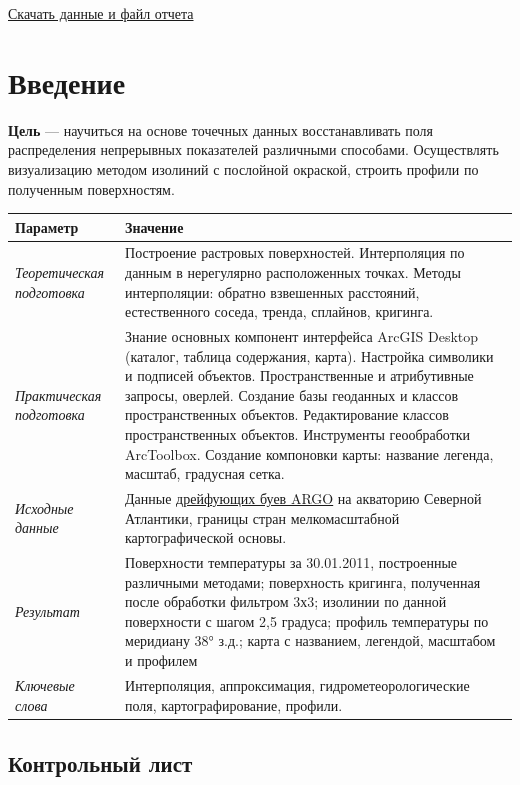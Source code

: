 \documentclass[12pt,]{book}
\begin{document}
\href{http://autolab.geogr.msu.ru/gis/data/Ex17.zip}{Скачать данные и файл отчета}

\hypertarget{interpolation-intro}{%
\section{Введение}\label{interpolation-intro}}

\textbf{Цель} --- научиться на основе точечных данных восстанавливать поля распределения непрерывных показателей различными способами. Осуществлять визуализацию методом изолиний с послойной окраской, строить профили по полученным поверхностям.

\begin{longtable}[]{@{}ll@{}}
\toprule
Параметр & Значение\tabularnewline
\midrule
\endhead
\emph{Теоретическая подготовка} & Построение растровых поверхностей. Интерполяция по данным в нерегулярно расположенных точках. Методы интерполяции: обратно взвешенных расстояний, естественного соседа, тренда, сплайнов, кригинга.\tabularnewline
\emph{Практическая подготовка} & Знание основных компонент интерфейса ArcGIS Desktop (каталог, таблица содержания, карта). Настройка символики и подписей объектов. Пространственные и атрибутивные запросы, оверлей. Создание базы геоданных и классов пространственных объектов. Редактирование классов пространственных объектов. Инструменты геообработки ArcToolbox. Создание компоновки карты: название легенда, масштаб, градусная сетка.\tabularnewline
\emph{Исходные данные} & Данные \href{http://www.argo.ucsd.edu}{дрейфующих буев ARGO} на акваторию Северной Атлантики, границы стран мелкомасштабной картографической основы.\tabularnewline
\emph{Результат} & Поверхности температуры за 30.01.2011, построенные различными методами; поверхность кригинга, полученная после обработки фильтром 3х3; изолинии по данной поверхности с шагом 2,5 градуса; профиль температуры по меридиану 38° з.д.; карта с названием, легендой, масштабом и профилем\tabularnewline
\emph{Ключевые слова} & Интерполяция, аппроксимация, гидрометеорологические поля, картографирование, профили.\tabularnewline
\bottomrule
\end{longtable}

\hypertarget{interpolation-control}{%
\subsection{Контрольный лист}\label{interpolation-control}}
\end{document}
